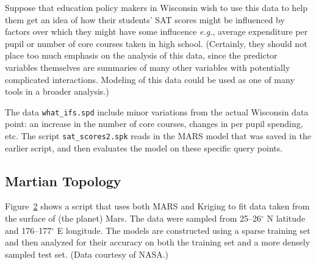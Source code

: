 \documentclass{article}
\begin{document}
Suppose that education policy makers in Wisconsin wish to use this data to help them get an idea of how their students' SAT scores might be influenced by factors over which they might have some influcence {\em e.g.}, average expenditure per pupil or number of core courses taken in high school.  (Certainly, they should not place too much emphasis on the analysis of this data, since the predictor variables themselves are summaries of many other variables with potentially complicated interactions.  Modeling of this data could be used as one of many tools in a broader analysis.)  

The data \texttt{what\_ifs.spd} include minor variations from the actual Wisconsin data point: an increase in the number of core courses, changes in per pupil spending, etc.  The script \texttt{sat\_scores2.spk} reads in the MARS model that was saved in the earlier script, and then evaluates the model on these specific query points.   

\begin{figure}[htbp]
  \centering
  \begin{bigbox}
	\begin{small}
	
 	\end{small}
  \end{bigbox}
   \label{fig:test_scores2}
\end{figure}

\pagebreak
\subsection {Martian Topology}

Figure~\ref{fig:topology} shows a script that uses both MARS and Kriging to fit data taken from the surface of (the planet) Mars.  The data were sampled from 25--26$^{\circ}$ N latitude and 176--177$^{\circ}$ E longitude. The models are constructed using a sparse training set and then analyzed for their accuracy on both the training set and a more densely sampled test set.  (Data courtesy of NASA.)

\begin{figure}[htbp]
  \centering
  \begin{bigbox}
	\begin{small}
	
 	\end{small}
  \end{bigbox}
   \label{fig:topology}
\end{figure}
\end{document}

